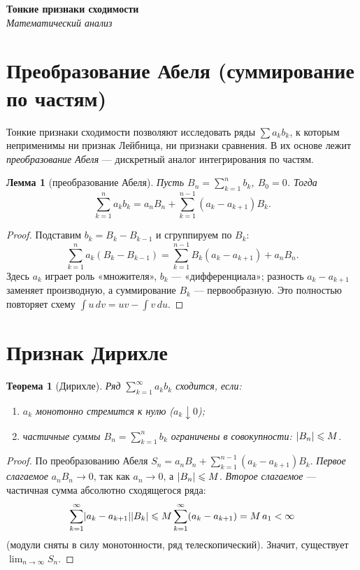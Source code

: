 \documentclass[11pt,a4paper]{article}
\newcommand{\coursename}{Математический анализ}
\newcommand{\doctitle}{Тонкие признаки сходимости}
\theoremstyle{definition}
\theoremstyle{plain}
\newtheorem{theorem}[definition]{Теорема}
\newtheorem{lemma}[definition]{Лемма}
\renewcommand{\le}{\leqslant}
\DeclarePairedDelimiter{\abs}{\lvert}{\rvert}
\begin{document}
\begin{center}
  {\LARGE\bfseries \doctitle}\\[4pt]
  {\large\itshape \coursename}
\end{center}
\vspace{6pt}

\section{Преобразование Абеля (суммирование по частям)}

Тонкие признаки сходимости позволяют исследовать ряды $\sum a_k b_k$, к которым неприменимы ни
признак Лейбница, ни признаки сравнения. В их основе лежит \emph{преобразование Абеля} —
дискретный аналог интегрирования по частям.

\begin{lemma}[преобразование Абеля]
Пусть $B_n=\sum_{k=1}^n b_k$, $B_0=0$. Тогда
\[
  \sum_{k=1}^n a_k b_k=a_n B_n+\sum_{k=1}^{n-1}(a_k-a_{k+1})B_k .
\]
\end{lemma}

\begin{proof}
Подставим $b_k=B_k-B_{k-1}$ и сгруппируем по $B_k$:
\[
  \sum_{k=1}^n a_k(B_k-B_{k-1})
   =\sum_{k=1}^{n-1}B_k(a_k-a_{k+1})+a_n B_n .
\]
Здесь $a_k$ играет роль «множителя», $b_k$ — «дифференциала»; разность $a_k-a_{k+1}$ заменяет
производную, а суммирование $B_k$ — первообразную. Это полностью повторяет схему
$\int u\,dv=uv-\int v\,du$.
\end{proof}

\section{Признак Дирихле}

\begin{theorem}[Дирихле]
Ряд $\displaystyle\sum_{k=1}^\infty a_k b_k$ сходится, если:
\begin{enumerate}[label=\arabic*),leftmargin=*]
  \item $a_k$ монотонно стремится к нулю ($a_k\downarrow0$);
  \item частичные суммы $B_n=\sum_{k=1}^n b_k$ ограничены в совокупности: $\abs{B_n}\le M$.
\end{enumerate}
\end{theorem}

\begin{proof}
По преобразованию Абеля $\displaystyle S_n=a_n B_n+\sum_{k=1}^{n-1}(a_k-a_{k+1})B_k$.
\emph{Первое слагаемое} $a_n B_n\to0$, так как $a_n\to0$, а $\abs{B_n}\le M$.
\emph{Второе слагаемое} — частичная сумма абсолютно сходящегося ряда:
\[
  \sum_{k=1}^{\infty}\abs{a_k-a_{k+1}}\abs{B_k}\le M\sum_{k=1}^{\infty}(a_k-a_{k+1})
   =M\,a_1<\infty
\]
(модули сняты в силу монотонности, ряд телескопический). Значит, существует
$\displaystyle\lim_{n\to\infty}S_n$.
\end{proof}
\end{document}
